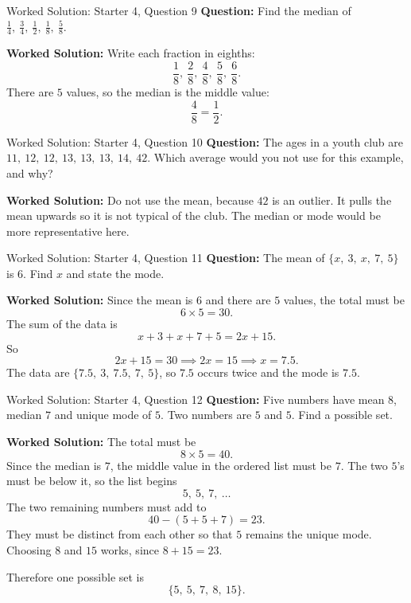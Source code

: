 \documentclass{beamer}
\begin{document}
\begin{frame}{Worked Solution: Starter 4, Question 9}
\small
\textbf{Question:} Find the median of \(\frac14,\ \frac34,\ \frac12,\ \frac18,\ \frac58\).

\smallskip
\textbf{Worked Solution:} Write each fraction in eighths:
\[
\frac18,\ \frac28,\ \frac48,\ \frac58,\ \frac68.
\]
There are \(5\) values, so the median is the middle value:
\[
\frac48=\frac12.
\]
\end{frame}

\begin{frame}{Worked Solution: Starter 4, Question 10}
\small
\textbf{Question:} The ages in a youth club are \(11,\ 12,\ 12,\ 13,\ 13,\ 13,\ 14,\ 42\). Which average would you not use for this example, and why?

\smallskip
\textbf{Worked Solution:} Do not use the mean, because \(42\) is an outlier. It pulls the mean upwards so it is not typical of the club. The median or mode would be more representative here.
\end{frame}

\begin{frame}{Worked Solution: Starter 4, Question 11}
\small
\textbf{Question:} The mean of \(\{x,\ 3,\ x,\ 7,\ 5\}\) is \(6\). Find \(x\) and state the mode.

\smallskip
\textbf{Worked Solution:} Since the mean is \(6\) and there are \(5\) values, the total must be
\[
6\times5=30.
\]
The sum of the data is
\[
x+3+x+7+5=2x+15.
\]
So
\[
2x+15=30 \implies 2x=15 \implies x=7.5.
\]
The data are \(\{7.5,\ 3,\ 7.5,\ 7,\ 5\}\), so \(7.5\) occurs twice and the mode is \(7.5\).
\end{frame}

\begin{frame}{Worked Solution: Starter 4, Question 12}
\small
\textbf{Question:} Five numbers have mean \(8\), median \(7\) and unique mode of \(5\). Two numbers are \(5\) and \(5\). Find a possible set.

\smallskip
\textbf{Worked Solution:} The total must be
\[
8\times5=40.
\]
Since the median is \(7\), the middle value in the ordered list must be \(7\). The two \(5\)'s must be below it, so the list begins
\[
5,\ 5,\ 7,\ \dots
\]
The two remaining numbers must add to
\[
40-(5+5+7)=23.
\]
They must be distinct from each other so that \(5\) remains the unique mode. Choosing \(8\) and \(15\) works, since \(8+15=23\).

Therefore one possible set is
\[
\{5,\ 5,\ 7,\ 8,\ 15\}.
\]
\end{frame}
\end{document}
